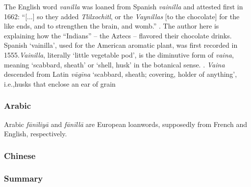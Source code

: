 The English word \textit{vanilla} was loaned from Spanish \textit{vainilla} and attested first in 1662: ``[...] so they added \textit{Tlilxochitl}, or the \textit{Vaynillas} [to the chocolate] for the like ends, and to strengthen the brain, and womb.'' \parencite[11]{stubbe_indian_1662}. The author here is explaining how the ``Indians'' -- the Aztecs -- flavored their chocolate drinks. Spanish `vainilla', used for the American aromatic plant,  was first recorded in 1555.\textit{Vainilla}, literally `little vegetable pod', is the diminutive form of \textit{vaina}, meaning `scabbard, sheath' or `shell, husk' in the botanical sense.  \parencites[596]{corominas_breve_1987}[538]{gomez_de_silva_elseviers_1985}. \textit{Vaina} descended from Latin \textit{vāgīna} `scabbard, sheath; covering, holder of anything', i.e.,husks that enclose an ear of grain 



\subsubsection{Arabic}



Arabic \textit{fānīliyā} and \textit{fānīllā} are European loanwords, supposedly from French and English, respectively.




\subsubsection{Chinese}





\subsubsection{Summary}


















